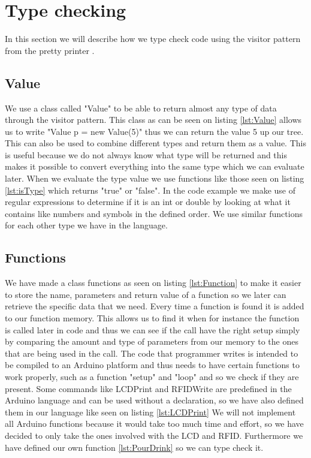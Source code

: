 \section{Type checking}
In this section we will describe how we type check code using the visitor pattern from the pretty printer .

\subsection*{Value}
We use a class called "Value" to be able to return almost any type of data through the visitor pattern.
This class as can be seen on listing \ref{lst:Value} allows us to write "Value p = new Value(5)" thus we can return the value 5 up our tree. This can also be used to combine different types and return them as a value. This is useful because we do not always know what type will be returned and this makes it possible to convert everything into the same type which we can evaluate later.
When we evaluate the type value we use functions like those seen on listing \ref{lst:isType} which returns "true" or "false". In the code example we make use of regular expressions to determine if it is an int or double by looking at what it contains like numbers and symbols in the defined order. We use similar functions for each other type we have in the language.

\subsection*{Functions}
We have made a class functions as seen on listing \ref{lst:Function} to make it easier to store the name, parameters and return value of a function so we  later can retrieve the specific data that we need. Every time a function is found it is added to our function memory. This allows us to find it when for instance the function is called later in code and thus we can see if the call have the right setup simply by comparing the amount and type of parameters from our memory to the ones that are being used in the call.
The code that programmer writes is intended to be compiled to an Arduino platform and thus needs to have certain functions to work properly, such as a function "setup" and "loop" and so we check if they are present. Some commands like LCDPrint and RFIDWrite are predefined in the Arduino language and can be used without a declaration, so we have also defined them in our language like seen on listing \ref{lst:LCDPrint}
We will not implement all Arduino functions because it would take too much time and effort, so we have decided to only take the ones involved with the LCD and RFID. Furthermore we have defined our own function \ref{lst:PourDrink} so we can type check it.

